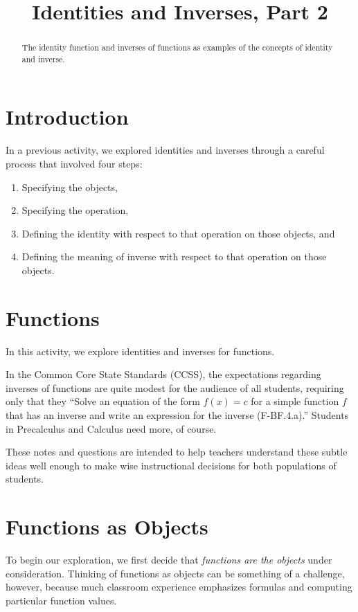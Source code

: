\documentclass{ximera}
\title{Identities and Inverses, Part 2}
\begin{document}
\begin{abstract}
The identity function and inverses of functions as examples of the concepts of identity and inverse.    
\end{abstract}
\maketitle


\section*{Introduction}
In a previous activity, we explored identities and inverses through a careful process that 
involved four steps:  
\begin{enumerate}
\item Specifying the objects,
\item Specifying the operation, 
\item Defining the identity with respect to that operation on those objects, and
\item Defining the meaning of inverse with respect to that operation on those objects. 
\end{enumerate}

\section*{Functions}
In this activity, we explore identities and inverses for functions.  
\begin{remark}
In the Common Core State Standards (CCSS), the expectations regarding inverses of functions are quite modest for the audience of all students, requiring only that they ``Solve an equation of the form $f(x) = c$ for a simple function $f$ that has an inverse and write an expression for the inverse (F-BF.4.a).''  Students in Precalculus and Calculus need more, of course.  

These notes and questions are intended to help teachers understand these subtle ideas well enough to make wise instructional decisions for both populations of students.   
\end{remark}

\section*{Functions as Objects}
To begin our exploration, we first decide that \emph{functions are the objects} under consideration.  Thinking of functions as objects can be something of a challenge, however, because much classroom experience  emphasizes formulas and computing particular function values. 
\end{document}
